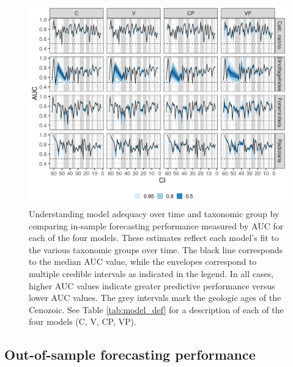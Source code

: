 \documentclass[12pt,letterpaper]{article}
\begin{document}
\begin{refsection}
\begin{figure}[ht]
 \centering
 \includegraphics[width=\textwidth,height=0.5\textheight,keepaspectratio=true]{../results/figure/auc_taxon_time_full}
 \caption{Understanding model adequacy over time and taxonomic group by comparing in-sample forecasting performance measured by AUC for each of the four models. These estimates reflect each model's fit to the various taxonomic groups over time. The black line corresponds to the median AUC value, while the envelopes correspond to multiple credible intervals as indicated in the legend. In all cases, higher AUC values indicate greater predictive performance versus lower AUC values. The grey intervals mark the geologic ages of the Cenozoic. See Table \ref{tab:model_def} for a description of each of the four models (C, V, CP, VP).}
 \label{fig:auc_taxon_time}
\end{figure}




\subsection{Out-of-sample forecasting performance}


\end{refsection}
\end{document}
